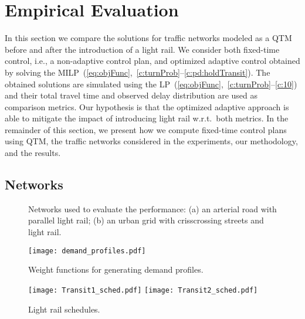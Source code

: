 \section{Empirical Evaluation}
  
In this section we compare the solutions for traffic networks modeled as a QTM
before and after the introduction of a light rail.
%
We consider both fixed-time control, i.e., a non-adaptive control plan, and optimized
adaptive control obtained by solving the
MILP~(\ref{eq:objFunc},~\ref{c:turnProb}--\ref{c:pd:holdTransit}).
%
The obtained solutions are simulated using the
LP~(\ref{eq:objFunc},~\ref{c:turnProb}--\ref{c:10}) and their total
travel time and observed delay distribution are used as comparison metrics.
%
Our hypothesis is that the optimized adaptive approach is able to mitigate the
impact of introducing light rail w.r.t.\ both metrics.
%
In the remainder of this section, we present how we compute fixed-time control plans
using QTM, the traffic networks considered in the experiments, our methodology,
and the results.






\subsection{Networks}

\begin{figure}[t!]
\centering
\caption{Networks used to evaluate the performance:
  (a) an arterial road with parallel light rail;
  (b) an urban grid with crisscrossing streets and light rail.
%
}
\label{fig:networks}
\end{figure}

\begin{figure}[t!]
\centering
\texttt{[image: demand\_profiles.pdf]}
\caption{Weight functions for generating demand profiles.}
\label{fig:demand_profiles}
\end{figure}

\begin{figure}[t!]
\centering
\texttt{[image: Transit1\_sched.pdf]}
\texttt{[image: Transit2\_sched.pdf]}
\caption{Light rail schedules.}
\label{fig:transits}
\end{figure}

